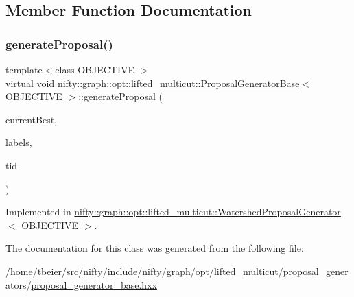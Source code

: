 \subsection{Member Function Documentation}
\mbox{\label{classnifty_1_1graph_1_1opt_1_1lifted__multicut_1_1ProposalGeneratorBase_ae00635fcec34663a1ec72cac36514e0a}} 
\subsubsection{\texorpdfstring{generate\+Proposal()}{generateProposal()}}
{\footnotesize\ttfamily template$<$class O\+B\+J\+E\+C\+T\+I\+VE $>$ \\
virtual void \hyperlink{classnifty_1_1graph_1_1opt_1_1lifted__multicut_1_1ProposalGeneratorBase}{nifty\+::graph\+::opt\+::lifted\+\_\+multicut\+::\+Proposal\+Generator\+Base}$<$ O\+B\+J\+E\+C\+T\+I\+VE $>$\+::generate\+Proposal (\begin{DoxyParamCaption}\item[{const \hyperlink{classnifty_1_1graph_1_1opt_1_1lifted__multicut_1_1ProposalGeneratorBase_ab102e54a80aba7ed8884d61ae0803954}{Node\+Labels\+Type} \&}]{current\+Best,  }\item[{\hyperlink{classnifty_1_1graph_1_1opt_1_1lifted__multicut_1_1ProposalGeneratorBase_ab102e54a80aba7ed8884d61ae0803954}{Node\+Labels\+Type} \&}]{labels,  }\item[{const size\+\_\+t}]{tid }\end{DoxyParamCaption})\hspace{0.3cm}{\ttfamily [pure virtual]}}



Implemented in \hyperlink{classnifty_1_1graph_1_1opt_1_1lifted__multicut_1_1WatershedProposalGenerator_ab831f2fa9c17d253d3dfd2005130b49c}{nifty\+::graph\+::opt\+::lifted\+\_\+multicut\+::\+Watershed\+Proposal\+Generator$<$ O\+B\+J\+E\+C\+T\+I\+V\+E $>$}.



The documentation for this class was generated from the following file\+:\begin{DoxyCompactItemize}
\item 
/home/tbeier/src/nifty/include/nifty/graph/opt/lifted\+\_\+multicut/proposal\+\_\+generators/\hyperlink{lifted__multicut_2proposal__generators_2proposal__generator__base_8hxx}{proposal\+\_\+generator\+\_\+base.\+hxx}\end{DoxyCompactItemize}
